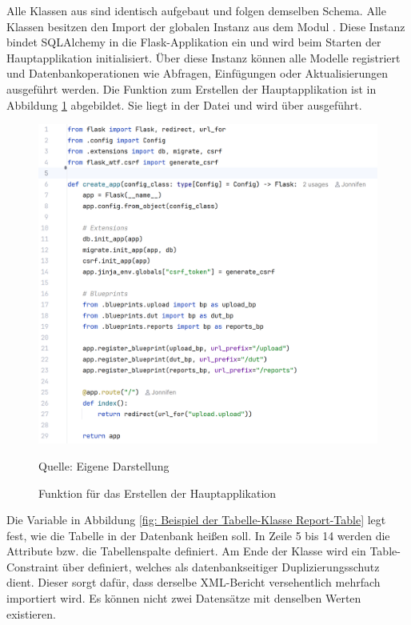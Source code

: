 Alle Klassen aus  sind identisch aufgebaut und folgen demselben Schema.
Alle Klassen besitzen den Import der globalen Instanz  aus dem Modul .
Diese Instanz bindet SQLAlchemy in die Flask-Applikation ein und wird beim Starten der Hauptapplikation initialisiert.
Über diese Instanz  können alle Modelle registriert und Datenbankoperationen wie Abfragen, Einfügungen oder Aktualisierungen ausgeführt werden.
Die Funktion zum Erstellen der Hauptapplikation ist in Abbildung \ref{fig: Funktion für das Erstellen der Hauptapplikation} abgebildet.
Sie liegt in der Datei  und wird über  ausgeführt.

\begin{figure}[H]
    \centering
    \includegraphics[width=1\textwidth]{Grafiken/createapp.png}
    \caption{Funktion für das Erstellen der Hauptapplikation}
    \label{fig: Funktion für das Erstellen der Hauptapplikation}
    {Quelle: Eigene Darstellung}
\end{figure}


Die Variable  in Abbildung \ref{fig: Beispiel der Tabelle-Klasse Report-Table} legt fest, wie die Tabelle in der Datenbank heißen soll.
In Zeile 5 bis 14 werden die Attribute bzw. die Tabellenspalte definiert.
Am Ende der Klasse wird ein Table-Constraint über  definiert, welches als datenbankseitiger Duplizierungsschutz dient.
Dieser sorgt dafür, dass derselbe XML-Bericht versehentlich mehrfach importiert wird.
Es können nicht zwei Datensätze mit denselben Werten existieren.

